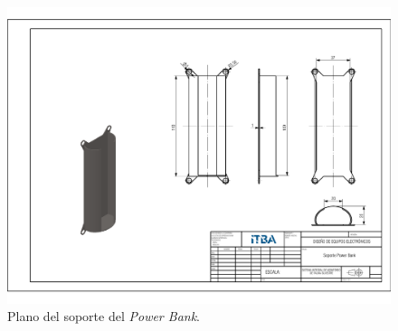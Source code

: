 \begin{figure}[H]
	\centering
	\includegraphics[width=\linewidth]{ImagenesApendice/Charger}
	\caption{Plano del soporte del \textit{Power Bank}.}
	\label{fig:Charger}
\end{figure}